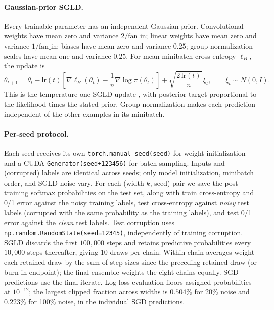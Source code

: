 \paragraph{Gaussian-prior SGLD.}
Every trainable parameter has an independent Gaussian prior. Convolutional
weights have mean zero and variance $2/\mathrm{fan\_in}$; linear weights
have mean zero and variance $1/\mathrm{fan\_in}$; biases have mean zero and
variance $0.25$; group-normalization scales have mean one and variance
$0.25$. For mean minibatch cross-entropy $\ell_B$, the update is
\[
\theta_{t+1}=\theta_t-\mathrm{lr}(t)
\left[\nabla\ell_B(\theta_t)-\frac{1}{n}\nabla\log\pi(\theta_t)\right]
+\sqrt{\frac{2\,\mathrm{lr}(t)}{n}}\,\xi_t,\qquad \xi_t\sim N(0,I).
\]
This is the temperature-one SGLD update \citep{welling2011sgld}, with
posterior target proportional to the likelihood times the stated prior.
Group normalization makes each prediction independent of the other
examples in its minibatch.

\paragraph{Per-seed protocol.}
Each seed receives its own \texttt{torch.manual\_seed(seed)} for weight
initialization and a CUDA \texttt{Generator(seed+123456)} for batch
sampling. Inputs and (corrupted) labels are identical across seeds; only
model initialization, minibatch order, and SGLD noise vary. For each (width $k$, seed)
pair we save the post-training softmax probabilities on the test set,
along with train cross-entropy and 0/1 error against the noisy training
labels, test cross-entropy against \emph{noisy} test labels (corrupted
with the same probability as the training labels), and test 0/1 error
against the \emph{clean} test labels. Test corruption uses
\texttt{np.random.RandomState(seed=12345)}, independently of training
corruption. SGLD discards the first $100{,}000$ steps and retains
predictive probabilities every $10{,}000$ steps thereafter, giving 10
draws per chain. Within-chain averages weight each retained draw by the
sum of step sizes since the preceding retained draw (or burn-in endpoint);
the final ensemble weights the eight chains equally. SGD predictions use
the final iterate. Log-loss evaluation floors assigned probabilities at
$10^{-12}$; the largest clipped fraction across widths is $0.504\%$ for
20\% noise and $0.223\%$ for 100\% noise, in the individual SGD predictions.

